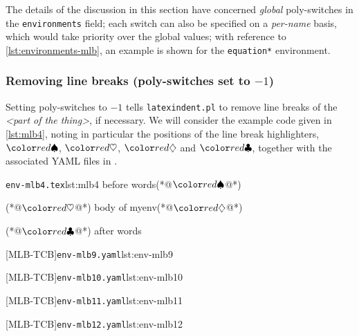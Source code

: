 	\begin{minipage}{.45\linewidth}
	\end{minipage}
	\hfill
	\begin{minipage}{.45\linewidth}
	\end{minipage}

	The details of the discussion in this section have concerned \emph{global} poly-switches in the \texttt{environments} field;
	each switch can also be specified on a \emph{per-name} basis, which would take priority over the global values; with
	reference to \vref{lst:environments-mlb}, an example is shown for the \texttt{equation*} environment.

\subsubsection{Removing line breaks (poly-switches set to $-1$)}
	Setting poly-switches to $-1$ tells \texttt{latexindent.pl} to remove line breaks of the \emph{<part of the thing>}, if necessary. We will consider the
	example code given in \cref{lst:mlb4}, noting in particular the positions of
	the line break highlighters, $\BeginStartsOnOwnLine$, $\BodyStartsOnOwnLine$, $\EndStartsOnOwnLine$
	and $\EndFinishesWithLineBreak$, together with the associated YAML files in .

	\begin{minipage}{.45\linewidth}
		\begin{cmhlistings}[escapeinside={(*@}{@*)}]{\texttt{env-mlb4.tex}}{lst:mlb4}
before words(*@$\BeginStartsOnOwnLine$@*)
\begin{myenv}(*@$\BodyStartsOnOwnLine$@*)
body of myenv(*@$\EndStartsOnOwnLine$@*)
\end{myenv}(*@$\EndFinishesWithLineBreak$@*)
after words
\end{cmhlistings}
	\end{minipage}%
	\hfill
	\begin{minipage}{.51\textwidth}
		[MLB-TCB]{\texttt{env-mlb9.yaml}}{lst:env-mlb9}

		[MLB-TCB]{\texttt{env-mlb10.yaml}}{lst:env-mlb10}

		[MLB-TCB]{\texttt{env-mlb11.yaml}}{lst:env-mlb11}

		[MLB-TCB]{\texttt{env-mlb12.yaml}}{lst:env-mlb12}
	\end{minipage}

